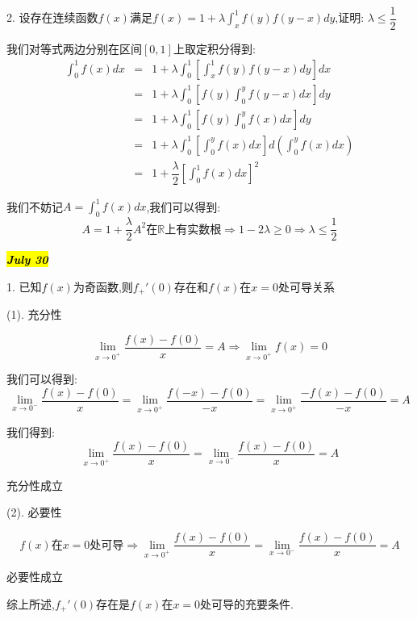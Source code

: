 2. 设存在连续函数$f(x)$满足$f(x)=1+\lambda\int_{x}^{1}f(y)f(y-x)dy$,证明: $\lambda\leq \dfrac{1}{2}$
\begin{solution}
	
	我们对等式两边分别在区间$[0,1]$上取定积分得到: 
	\begin{eqnarray*}
		\int_{0}^{1}f(x)dx&=&1+\lambda\int_{0}^{1}[\int_{x}^{1}f(y)f(y-x)dy]dx\\
		&=&1+\lambda\int_{0}^{1}[f(y)\int_{0}^{y}f(y-x)dx]dy\\
		&=&1+\lambda\int_{0}^{1}[f(y)\int_{0}^{y}f(x)dx]dy\\
		&=&1+\lambda\int_{0}^{1}[\int_{0}^{y}f(x)dx]d(\int_{0}^{y}f(x)dx)\\
		&=&1+\dfrac{\lambda}{2}[\int_{0}^{1}f(x)dx]^2
	\end{eqnarray*}
	
	我们不妨记$A=\int_{0}^{1}f(x)dx$,我们可以得到: 
	$$A=1+\dfrac{\lambda}{2}A^2\text{在}\mathbb{R}\text{上有实数根}\Rightarrow 1-2\lambda\geq 0\Rightarrow \lambda\leq \dfrac{1}{2}$$
\end{solution}

\hl{\textbf{\textit{July 30}}}

1. 已知$f(x)$为奇函数,则$f_{+}'(0)$存在和$f(x)$在$x=0$处可导关系
\begin{solution}
	
	(1). 充分性
	
	$$\lim\limits_{x\rightarrow 0^{+}}\dfrac{f(x)-f(0)}{x}=A\Rightarrow \lim\limits_{x\rightarrow 0^{+}}f(x)=0$$
	
	我们可以得到: 
	$$\lim\limits_{x\rightarrow 0^{-}}\dfrac{f(x)-f(0)}{x}=\lim\limits_{x\rightarrow 0^{+}}\dfrac{f(-x)-f(0)}{-x}=\lim\limits_{x\rightarrow 0^{+}}\dfrac{-f(x)-f(0)}{-x}=A$$
	
	我们得到: $$\lim\limits_{x\rightarrow 0^{+}}\dfrac{f(x)-f(0)}{x}=\lim\limits_{x\rightarrow 0^{-}}\dfrac{f(x)-f(0)}{x}=A$$
	
	充分性成立
	
	(2). 必要性
	
	$$f(x)\text{在}x=0\text{处可导}\Rightarrow \lim\limits_{x\rightarrow 0^{+}}\dfrac{f(x)-f(0)}{x}=\lim\limits_{x\rightarrow 0^{-}}\dfrac{f(x)-f(0)}{x}=A$$
	
	必要性成立
	
	综上所述,$f_{+}'(0)$存在是$f(x)$在$x=0$处可导的充要条件.
\end{solution} 

